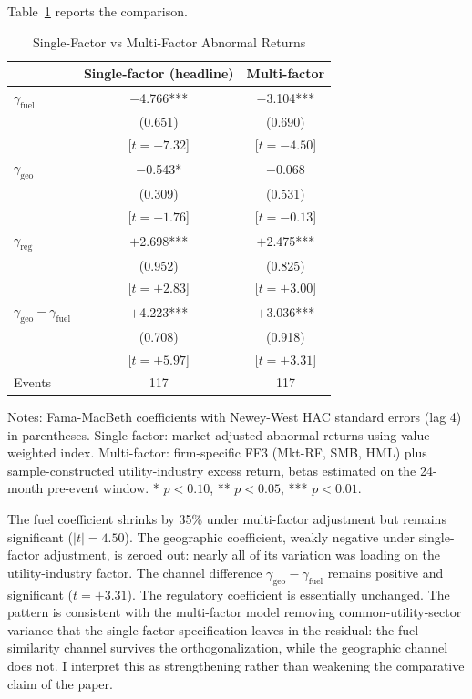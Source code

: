 \documentclass[12pt,a4paper]{article}
\begin{document}
Table~\ref{tab:multifactor_comparison} reports the comparison.

\begin{table}[H]
\centering
\caption{Single-Factor vs Multi-Factor Abnormal Returns}
\label{tab:multifactor_comparison}
\begin{tabular}{lcc}
\toprule
 & Single-factor (headline) & Multi-factor \\
\midrule
$\gamma_{\text{fuel}}$ & $-$4.766*** & $-$3.104*** \\
 & (0.651) & (0.690) \\
 & [$t=-7.32$] & [$t=-4.50$] \\[4pt]
$\gamma_{\text{geo}}$ & $-$0.543* & $-$0.068 \\
 & (0.309) & (0.531) \\
 & [$t=-1.76$] & [$t=-0.13$] \\[4pt]
$\gamma_{\text{reg}}$ & $+$2.698*** & $+$2.475*** \\
 & (0.952) & (0.825) \\
 & [$t=+2.83$] & [$t=+3.00$] \\[4pt]
\midrule
$\gamma_{\text{geo}} - \gamma_{\text{fuel}}$ & $+$4.223*** & $+$3.036*** \\
 & (0.708) & (0.918) \\
 & [$t=+5.97$] & [$t=+3.31$] \\[4pt]
\midrule
Events & 117 & 117 \\
\bottomrule
\end{tabular}
\begin{flushleft}\footnotesize
Notes: Fama-MacBeth coefficients with Newey-West HAC standard errors (lag 4) in parentheses. Single-factor: market-adjusted abnormal returns using value-weighted index. Multi-factor: firm-specific FF3 (Mkt-RF, SMB, HML) plus sample-constructed utility-industry excess return, betas estimated on the 24-month pre-event window. * $p<0.10$, ** $p<0.05$, *** $p<0.01$.
\end{flushleft}
\end{table}

The fuel coefficient shrinks by 35\% under multi-factor adjustment but remains significant ($|t| = 4.50$). The geographic coefficient, weakly negative under single-factor adjustment, is zeroed out: nearly all of its variation was loading on the utility-industry factor. The channel difference $\gamma_{\text{geo}} - \gamma_{\text{fuel}}$ remains positive and significant ($t = +3.31$). The regulatory coefficient is essentially unchanged. The pattern is consistent with the multi-factor model removing common-utility-sector variance that the single-factor specification leaves in the residual: the fuel-similarity channel survives the orthogonalization, while the geographic channel does not. I interpret this as strengthening rather than weakening the comparative claim of the paper.
\end{document}
